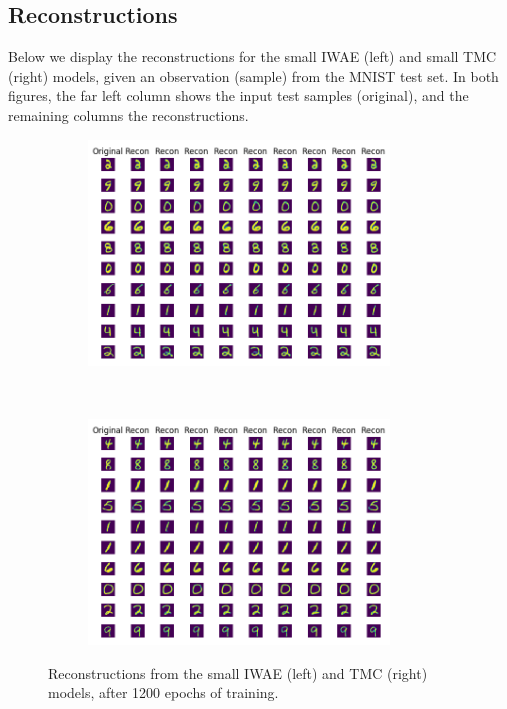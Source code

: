 \begin{appendices}
\section{Reconstructions}
\label{sec:app_rec}
Below we display the reconstructions for the small IWAE (left) and small TMC (right) models, given an observation (sample) from the MNIST test set. In both figures, the far left column shows the input test samples (original), and the remaining columns the reconstructions. 

\begin{figure}[th!]
    \centering
    \begin{subfigure}[t]{0.5\textwidth}
    \hspace*{-2cm}
        \centering
        \includegraphics[height=6cm]{Figures/IWAE_recon_small.png}
    \end{subfigure}%
    ~ 
    \begin{subfigure}[t]{0.5\textwidth}
        \centering
        \includegraphics[height=6cm]{Figures/TMC_recon_small.png}
    \end{subfigure}
    \caption{Reconstructions from the small IWAE (left) and TMC (right) models, after 1200 epochs of training.}
    \label{fig:reconstructions}
\end{figure}


\end{appendices}
